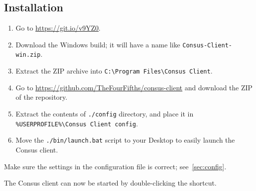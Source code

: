 \subsection{Installation}
\label{subsec:client_install}

\begin{enumerate}
  \item Go to \url{https://git.io/v9YZ0}.
  \item Download the Windows build; it will have a name like \texttt{Consus-Client-win.zip}.
  \item Extract the ZIP archive into \texttt{C:\textbackslash{}Program Files\textbackslash{}Consus Client}.
  \item Go to \url{https://github.com/TheFourFifths/consus-client} and download the ZIP of the repository.
  \item Extract the contents of \texttt{./config} directory, and place it in \texttt{\%USERPROFILE\%\textbackslash{}Consus Client config}.
  \item Move the \texttt{./bin/launch.bat} script to your Desktop to easily launch the Consus client.
\end{enumerate}

Make sure the settings in the configuration file is correct; see~\autoref{sec:config}.

The Consus client can now be started by double-clicking the shortcut.
